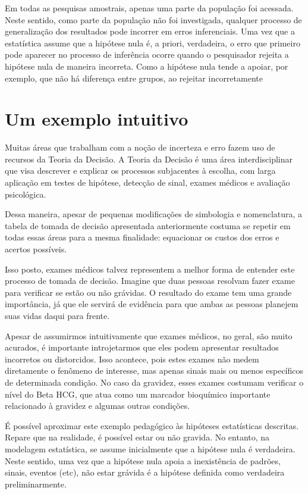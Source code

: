 \documentclass[
]{book}
\begin{document}
Em todas as pesquisas amostrais, apenas uma parte da população foi acessada. Neste sentido, como parte da população não foi investigada, qualquer processo de generalização dos resultados pode incorrer em erros inferenciais. Uma vez que a estatística assume que a hipótese nula é, a priori, verdadeira, o erro que primeiro pode aparecer no processo de inferência ocorre quando o pesquisador rejeita a hipótese nula de maneira incorreta. Como a hipótese nula tende a apoiar, por exemplo, que não há diferença entre grupos, ao rejeitar incorretamente

\hypertarget{um-exemplo-intuitivo}{%
\section{Um exemplo intuitivo}\label{um-exemplo-intuitivo}}

Muitas áreas que trabalham com a noção de incerteza e erro fazem uso de recursos da Teoria da Decisão. A Teoria da Decisão é uma área interdisciplinar que visa descrever e explicar os processos subjacentes à escolha, com larga aplicação em testes de hipótese, detecção de sinal, exames médicos e avaliação psicológica.

Dessa maneira, apesar de pequenas modificações de simbologia e nomenclatura, a tabela de tomada de decisão apresentada anteriormente costuma se repetir em todas essas áreas para a mesma finalidade: equacionar os custos dos erros e acertos possíveis.

Isso posto, exames médicos talvez representem a melhor forma de entender este processo de tomada de decisão. Imagine que duas pessoas resolvam fazer exame para verificar se estão ou não grávidas. O resultado do exame tem uma grande importância, já que ele servirá de evidência para que ambas as pessoas planejem suas vidas daqui para frente.

Apesar de assumirmos intuitivamente que exames médicos, no geral, são muito acurados, é importante introjetarmos que eles podem apresentar resultados incorretos ou distorcidos. Isso acontece, pois estes exames não medem diretamente o fenômeno de interesse, mas apenas sinais mais ou menos específicos de determinada condição. No caso da gravidez, esses exames costumam verificar o nível do Beta HCG, que atua como um marcador bioquímico importante relacionado à gravidez e algumas outras condições.

É possível aproximar este exemplo pedagógico às hipóteses estatísticas descritas. Repare que na realidade, é possível estar ou não gravida. No entanto, na modelagem estatística, se assume inicialmente que a hipótese nula é verdadeira. Neste sentido, uma vez que a hipótese nula apoia a inexistência de padrões, sinais, eventos (etc), não estar grávida é a hipótese definida como verdadeira preliminarmente.
\end{document}
